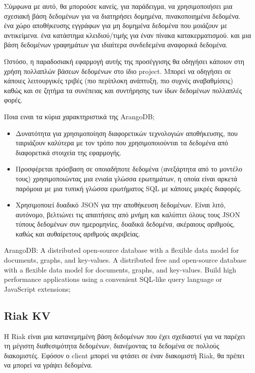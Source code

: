 \documentclass[conference]{IEEEtran}
\begin{document}
Σύμφωνα με αυτό, θα μπορούσε κανείς, για παράδειγμα, να χρησιμοποιήσει μια σχεσιακή βάση δεδομένων για να διατηρήσει δομημένα, πινακοποιημένα δεδομένα. ένα χώρο αποθήκευσης εγγράφων για μη δομημένα δεδομένα που μοιάζουν με αντικείμενα. ένα κατάστημα κλειδιού/τιμής για έναν πίνακα κατακερματισμού. και μια βάση δεδομένων γραφημάτων για ιδιαίτερα συνδεδεμένα αναφορικά δεδομένα.

Ωστόσο, η παραδοσιακή εφαρμογή αυτής της προσέγγισης θα οδηγήσει κάποιον στη χρήση πολλαπλών βάσεων δεδομένων στο ίδιο project. Μπορεί να οδηγήσει σε κάποιες λειτουργικές τριβές (πιο περίπλοκη ανάπτυξη, πιο συχνές αναβαθμίσεις) καθώς και σε ζητήμα τα συνέπειας και συντήρησης των ίδων δεδομένων πολλαπλές φορές.

Ποια ειναι τα κύρια χαρακτηριστικά της ArangoDB;
\begin{itemize}
    \item 
    Δυνατότητα για χρησιμοποίηση διαφορετικών τεχνολογιών αποθήκευσης, που ταιριάζουν καλύτερα με τον τρόπο που χρησιμοποιούνται τα δεδομένα από διαφορετικά στοιχεία της εφαρμογής.
    
    \item 
    Προσφέρεται πρόσβαση σε οποιαδήποτε δεδομένα (ανεξάρτητα από το μοντέλο τους) χρησιμοποιώντας μια ενιαία γλώσσα ερωτημάτων, η οποία είναι αρκετά παρόμοια με μια τυπική γλώσσα ερωτήματος SQL με κάποιες μικρές διαφορές.

    \item 
    Χρησιμοποιεί δυαδικό JSON για την αποθήκευση δεδομένων. Είναι λιτό, αυτόνομο, βελτιώνει τις απαιτήσεις από μνήμη και καλύπτει όλους τους JSON τύπους δεδομένων συν ημερομηνίες, δυαδικά δεδομένα, ακέραιους αριθμούς, καθώς και αυθαίρετους αριθμούς ακριβείας.
\end{itemize}

ArangoDB: A distributed open-source database with a flexible data model for documents, graphs, and key-values. A distributed free and open-source database with a flexible data model for documents, graphs, and key-values. Build high performance applications using a convenient SQL-like query language or JavaScript extensions;

\subsection{Riak KV}

 Η Riak είναι μια κατανεμημένη βάση δεδομένων που έχει σχεδιαστεί για να παρέχει τη μέγιστη διαθεσιμότητα δεδομένων, διανέμοντας τα δεδομένα σε πολλούς διακομιστές. Εφόσον ο client μπορεί να φτάσει σε έναν διακομιστή Riak, θα πρέπει να μπορεί να γράψει δεδομένα.
\end{document}
